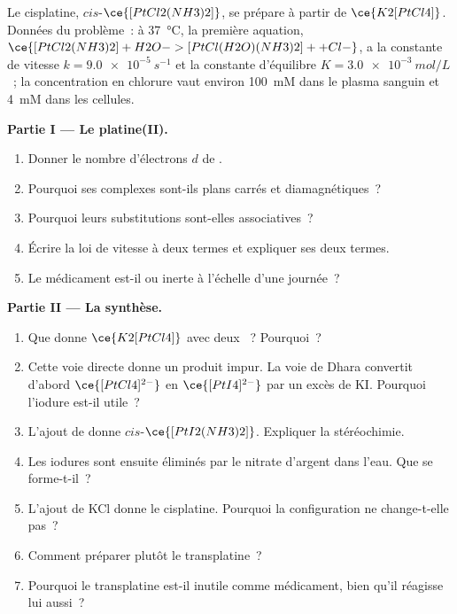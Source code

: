 \begin{problem}
\label{pb:b3:complex-mechanisms:1}
Le cisplatine, $cis$-$\ce{[PtCl2(NH3)2]}$, se prépare à partir de $\ce{K2[PtCl4]}$. Données du problème~: à
\qty{37}{\celsius}, la première aquation, $\ce{[PtCl2(NH3)2] + H2O -> [PtCl(H2O)(NH3)2]+ + Cl-}$, a la
constante de vitesse $k = \qty{9.0e-5}{s^{-1}}$ et la constante d'équilibre $K = \qty{3.0e-3}{mol/L}$~; la
concentration en chlorure vaut environ \qty{100}{mM} dans le plasma sanguin
et \qty{4}{mM} dans les cellules.

\medskip\noindent\textbf{Partie I --- Le platine(II).}
\begin{enumerate}
  \item Donner le nombre d'électrons $d$ de .
  \item Pourquoi ses complexes sont-ils plans carrés et diamagnétiques~?
  \item Pourquoi leurs substitutions sont-elles associatives~?
  \item Écrire la loi de vitesse à deux termes et expliquer ses deux termes.
  \item Le médicament est-il  ou inerte à l'échelle d'une journée~?
\end{enumerate}

\medskip\noindent\textbf{Partie II --- La synthèse.}
\begin{enumerate}[resume]
  \item Que donne $\ce{K2[PtCl4]}$ avec deux ~? Pourquoi~?
  \item Cette voie directe donne un produit impur. La voie de Dhara
        convertit d'abord $\ce{[PtCl4]^{2-}}$ en $\ce{[PtI4]^{2-}}$ par un excès de KI. Pourquoi
        l'iodure est-il utile~?
  \item L'ajout de  donne $cis$-$\ce{[PtI2(NH3)2]}$. Expliquer la stéréochimie.
  \item Les iodures sont ensuite éliminés par le nitrate d'argent dans
        l'eau. Que se forme-t-il~?
  \item L'ajout de KCl donne le cisplatine. Pourquoi la configuration ne
        change-t-elle pas~?
  \item Comment préparer plutôt le transplatine~?
  \item Pourquoi le transplatine est-il inutile comme médicament, bien qu'il
        réagisse lui aussi~?
\end{enumerate}


\end{problem}
